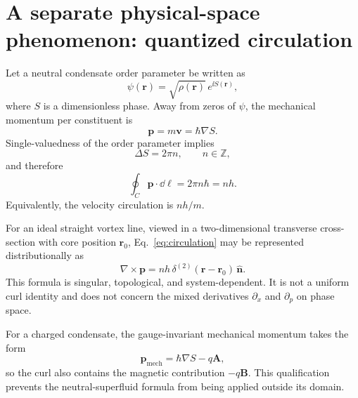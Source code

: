 \section{A separate physical-space phenomenon: quantized circulation}

Let a neutral condensate order parameter be written as \cite{Tsubota}
\begin{equation}
\psi(\bm{r})=\sqrt{\rho(\bm{r})}\,e^{\ii S(\bm{r})},
\end{equation}
where \(S\) is a dimensionless phase. Away from zeros of \(\psi\), the mechanical momentum per constituent is
\begin{equation}
\bm{p}=m\bm{v}=\hbar\nabla S.
\label{eq:phase-momentum}
\end{equation}
Single-valuedness of the order parameter implies
\begin{equation}
\Delta S=2\pi n,
\qquad n\in\mathbb{Z},
\end{equation}
and therefore
\begin{equation}
\boxed{
\oint_C \bm{p}\cdot\dd\bm{\ell}
=2\pi n\hbar
=nh.
}
\label{eq:circulation}
\end{equation}
Equivalently, the velocity circulation is \(nh/m\).

For an ideal straight vortex line, viewed in a two-dimensional transverse cross-section with core position \(\bm{r}_0\), Eq.~\eqref{eq:circulation} may be represented distributionally as
\begin{equation}
\boxed{
\nabla\times\bm{p}
=nh\,\delta^{(2)}(\bm{r}-\bm{r}_0)\,\hat{\bm{n}}.
}
\label{eq:vorticity}
\end{equation}
This formula is singular, topological, and system-dependent. It is not a uniform curl identity and does not concern the mixed derivatives \(\partial_x\) and \(\partial_p\) on phase space.

For a charged condensate, the gauge-invariant mechanical momentum takes the form
\begin{equation}
\bm{p}_{\mathrm{mech}}
=
\hbar\nabla S-q\bm{A},
\end{equation}
so the curl also contains the magnetic contribution \(-q\bm{B}\). This qualification prevents the neutral-superfluid formula from being applied outside its domain.
